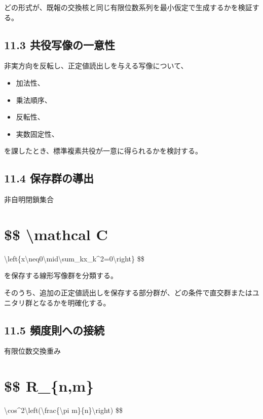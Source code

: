 \documentclass[
  a4paper,
  10pt]{article}
\providecommand{\tightlist}{%
  \setlength{\itemsep}{0pt}\setlength{\parskip}{0pt}}
\begin{document}
どの形式が、既報の交換核と同じ有限位数系列を最小仮定で生成するかを検証する。

\subsection{11.3
共役写像の一意性}\label{113-ux5171ux5f79ux5199ux50cfux306eux4e00ux610fux6027}

非実方向を反転し、正定値読出しを与える写像について、

\begin{itemize}
\tightlist
\item
  加法性、
\item
  乗法順序、
\item
  反転性、
\item
  実数固定性、
\end{itemize}

を課したとき、標準複素共役が一意に得られるかを検討する。

\subsection{11.4
保存群の導出}\label{114-ux4fddux5b58ux7fa4ux306eux5c0eux51fa}

非自明閉鎖集合

\section{\$\$ \textbackslash mathcal C}\label{-mathcal-c}

\textbackslash left\{x\textbackslash neq0\textbackslash mid\textbackslash sum\_kx\_k\^{}2=0\textbackslash right\}
\$\$

を保存する線形写像群を分類する。

そのうち、追加の正定値読出しを保存する部分群が、どの条件で直交群またはユニタリ群となるかを明確化する。

\subsection{11.5
頻度則への接続}\label{115-ux983bux5ea6ux5247ux3078ux306eux63a5ux7d9a}

有限位数交換重み

\section{\$\$ R\_\{n,m\}}\label{-r_nm}

\textbackslash cos\^{}2\textbackslash left(\textbackslash frac\{\textbackslash pi
m\}\{n\}\textbackslash right) \$\$
\end{document}
